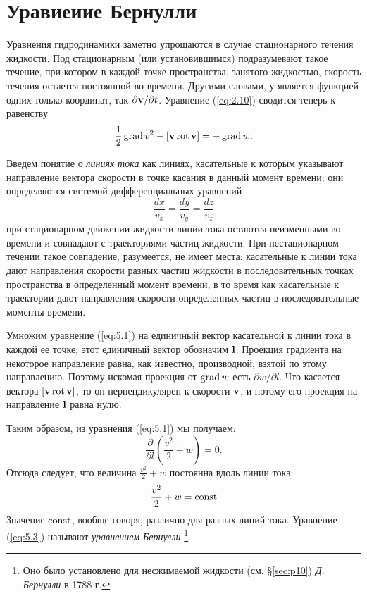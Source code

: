 \section{Уравиеиие Бернулли}
\label{sec:p5}

Уравнения гидродинамики заметно упрощаются в случае стационарного течения
жидкости. Под стационарным (или установившимся) подразумевают такое течение, при
котором в каждой точке пространства, занятого жидкостью, скорость течения
остается постоянной во времени. Другими словами, у является функцией одних
только координат, так $\partial{ \mathbf{v} }/\partial t$. Уравнение (\ref{eq:2.10}) сводится теперь
к равенству
\begin{equation}
   \label{eq:5.1}
   \frac{1}{2}\mathop{\mathrm{grad}}\nolimits{v^2} - \lbrack { \mathbf{v} } \mathop{\mathrm{rot}}\nolimits { \mathbf{v} } \rbrack = - \mathop{\mathrm{grad}}\nolimits w.
\end{equation}

Введем понятие о \textit{линиях тока} как линиях, касательные к которым
указывают направление вектора скорости в точке касания в данный момент времени;
они определяются системой дифференциальных уравнений
\begin{equation}
   \label{eq:5.2}
   \frac{dx}{v_x}=\frac{dy}{v_y}=\frac{dz}{v_z}
\end{equation}
при стационарном движении жидкости линии тока остаются неизменными во времени и
совпадают с траекториями частиц жидкости. При нестационарном течении такое
совпадение, разумеется, не имеет места: касательные к линии тока дают
направления скорости разных частиц жидкости в последовательных точках
пространства в определенный момент времени, в то время как касательные к
траектории дают направления скорости определенных частиц в последовательные
моменты времени.

Умножим уравнение (\ref{eq:5.1}) на единичный вектор касательной к линии тока в каждой ее
точке; этот единичный вектор обозначим $\mathbf{l}$. Проекция градиента на некоторое
направление равна, как известно, производной, взятой по этому направлению.
Поэтому искомая проекция от $\mathop{\mathrm{grad}}\nolimits w$ есть $\partial w/ \partial l$. Что
касается вектора $\lbrack { \mathbf{v} } \mathop{\mathrm{rot}}\nolimits { \mathbf{v} } \rbrack$, то он перпендикулярен к скорости $\mathbf{v}$, и потому
его проекция на направление $\mathbf{l}$ равна нулю.

Таким образом, из уравнения (\ref{eq:5.1}) мы получаем:
\[
   \frac{\partial}{\partial l}\left( \frac{v^2}{2} + w \right) = 0.
\]
Отсюда следует, что величина $\frac{v^2}{2} + w$ постоянна вдоль линии тока:
\begin{equation}
   \label{eq:5.3}
   \frac{v^2}{2} + w = \mathop{\mathrm{const}}\nolimits
\end{equation}
Значение $\mathop{\mathrm{const}}\nolimits$, вообще говоря, различно для разных линий тока. Уравнение
(\ref{eq:5.3}) называют \textit{уравнением Бернулли} \footnote{Оно было установлено для несжимаемой жидкости (см. \S \ref{sec:p10}) \textit{Д. Бернулли} в 1788 г.}.

